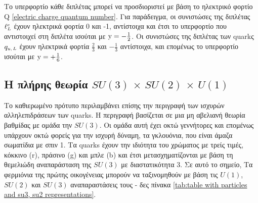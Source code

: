 Το υπερφορτίο κάθε διπλέτας μπορεί να προσδιοριστεί με βάση 
το ηλεκτρικό φορτίο Q \eqref{electric charge quantum number}. Για παράδειγμα, οι συνιστώσες της διπλέτας $\ell\superscr{e}\subscr{L}$ έχουν ηλεκτρικά φορτία 0 και -1, αντίστοιχα και έτσι το υπερφορτίο που αντιστοιχεί στη διπλέτα ισούται με $\text{y}=-\frac{1}{2}$. Οι συνιστώσες της διπλέτας των quarkς $q\subscr{u,L}$ έχουν ηλεκτρικά φορτία $\frac{2}{3}$ και $-\frac{1}{3}$ αντίστοιχα, και επομένως το υπερφορτίο ισούται με $\text{y}=+\frac{1}{6}$.


\subsection{Η πλήρης θεωρία \texorpdfstring{$SU(3)\,\times\,SU(2)\,\times\,U(1)$}{TEXT}}
Το καθιερωμένο πρότυπο περιλαμβάνει επίσης την περιγραφή των ισχυρών αλληλεπιδράσεων των quarks. Η περιγραφή βασίζεται σε μια μη αβελιανή θεωρία βαθμίδας με ομάδα την $SU(3)$. Οι ομάδα αυτή έχει οκτώ γεννήτορες και επομένως υπάρχουν οκτώ φορείς για την ισχυρή δύναμη, τα γκλουόνια, που είναι άμαζα σωματίδια με σπιν 1. 
Τα quarks έχουν την ιδιότητα του χρώματος 
με τρείς τιμές, κόκκινο (r), πράσινο (g) και μπλε (b) και έτσι μετασχηματίζονται με βάση τη θεμελιώδη αναπαράσταση της $SU(3)$ με διαστατικότητα 3. 
Σε αυτό το σημείο, 
Τα φερμιόνια της πρώτης οικογένειας μπορούν να ταξινομηθούν με βάση τις $U(1)$, $SU(2)$ και $SU(3)$ αναπαραστάσεις τους - δες πίνακα \ref{tab:table with particles and su3, su2 representations}. 

